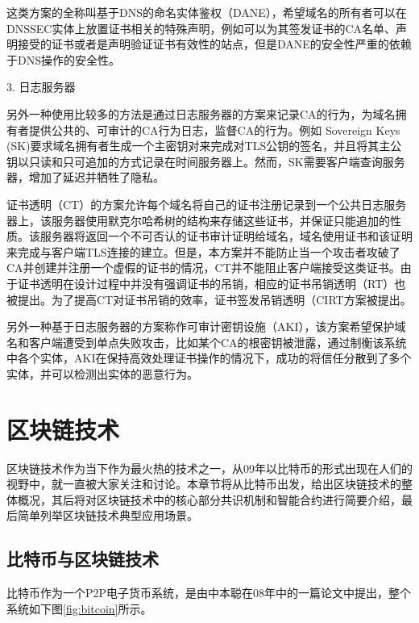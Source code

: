 这类方案的全称叫基于DNS的命名实体鉴权（DANE）\supercite{schlyter2012dns}，希望域名的所有者可以在DNSSEC实体上放置证书相关的特殊声明，例如可以为其签发证书的CA名单、声明接受的证书或者是声明验证证书有效性的站点，但是DANE的安全性严重的依赖于DNS操作的安全性。


3. 日志服务器

另外一种使用比较多的方法是通过日志服务器的方案来记录CA的行为，为域名拥有者提供公共的、可审计的CA行为日志，监督CA的行为。例如 Sovereign Keys (SK)\supercite{eckersleysovereign}要求域名拥有者生成一个主密钥对来完成对TLS公钥的签名，并且将其主公钥以只读和只可追加的方式记录在时间服务器上。然而，SK需要客户端查询服务器，增加了延迟并牺牲了隐私。

证书透明（CT）\supercite{laurie2013certificate}的方案允许每个域名将自己的证书注册记录到一个公共日志服务器上，该服务器使用默克尔哈希树的结构来存储这些证书，并保证只能追加的性质。该服务器将返回一个不可否认的证书审计证明给域名，域名使用证书和该证明来完成与客户端TLS连接的建立。但是，本方案并不能防止当一个攻击者攻破了CA并创建并注册一个虚假的证书的情况，CT并不能阻止客户端接受这类证书。由于证书透明在设计过程中并没有强调证书的吊销，相应的证书吊销透明（RT）\supercite{laurie2012revocation}也被提出。为了提高CT对证书吊销的效率，证书签发吊销透明（CIRT\supercite{ryan2014enhanced}方案被提出。

另外一种基于日志服务器的方案称作可审计密钥设施（AKI）\supercite{kim2013accountable}，该方案希望保护域名和客户端遭受到单点失败攻击，比如某个CA的根密钥被泄露，通过制衡该系统中各个实体，AKI在保持高效处理证书操作的情况下，成功的将信任分散到了多个实体，并可以检测出实体的恶意行为。






\section{区块链技术}




区块链技术作为当下作为最火热的技术之一，从09年以比特币的形式出现在人们的视野中，就一直被大家关注和讨论。本章节将从比特币出发，给出区块链技术的整体概况，其后将对区块链技术中的核心部分共识机制和智能合约进行简要介绍，最后简单列举区块链技术典型应用场景。

\subsection{比特币与区块链技术}


比特币作为一个P2P电子货币系统，是由中本聪在08年中的一篇论文中提出\supercite{nakamoto2008bitcoin}，整个系统如下图\ref{fig:bitcoin}所示。

